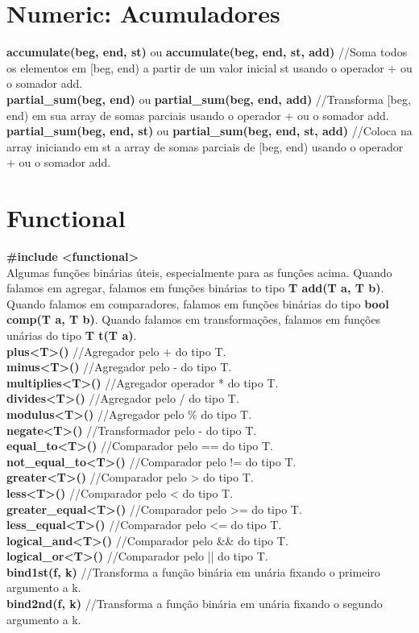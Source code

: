 \begin{multicols}{2}
\section{Numeric: Acumuladores}
\textbf{accumulate(beg, end, st)} ou \textbf{accumulate(beg, end, st, add)} //Soma todos os elementos em [beg, end) a partir de um valor inicial st usando o operador + ou o somador add.\\
\textbf{partial\_sum(beg, end)} ou \textbf{partial\_sum(beg, end, add)} //Transforma [beg, end) em sua array de somas parciais usando o operador + ou o somador add.
\textbf{partial\_sum(beg, end, st)} ou \textbf{partial\_sum(beg, end, st, add)} //Coloca na array iniciando em st a array de somas parciais de [beg, end) usando o operador + ou o somador add.

\section{Functional}

\textbf{\#include <functional>}\\
Algumas funções binárias úteis, especialmente para as funções acima. Quando falamos em agregar, falamos em funções binárias to tipo \textbf{T add(T a, T b)}. Quando falamos em comparadores, falamos em funções binárias do tipo \textbf{bool comp(T a, T b)}. Quando falamos em transformações, falamos em funções unárias do tipo \textbf{T t(T a)}.\\
\textbf{plus<T>()} //Agregador pelo + do tipo T.\\
\textbf{minus<T>()} //Agregador pelo - do tipo T.\\
\textbf{multiplies<T>()} //Agregador operador * do tipo T.\\
\textbf{divides<T>()} //Agregador pelo / do tipo T.\\
\textbf{modulus<T>()} //Agregador pelo \% do tipo T.\\
\textbf{negate<T>()} //Transformador pelo - do tipo T.\\
\textbf{equal\_to<T>()} //Comparador pelo == do tipo T.\\
\textbf{not\_equal\_to<T>()} //Comparador pelo != do tipo T.\\
\textbf{greater<T>()} //Comparador pelo > do tipo T.\\
\textbf{less<T>()} //Comparador pelo < do tipo T.\\
\textbf{greater\_equal<T>()} //Comparador pelo >= do tipo T.\\
\textbf{less\_equal<T>()} //Comparador pelo <= do tipo T.\\
\textbf{logical\_and<T>()} //Comparador pelo \&\& do tipo T.\\
\textbf{logical\_or<T>()} //Comparador pelo || do tipo T.\\
\textbf{bind1st(f, k)} //Transforma a função binária em unária fixando o primeiro argumento a k.\\
\textbf{bind2nd(f, k)} //Transforma a função binária em unária fixando o segundo argumento a k.\\

\end{multicols}